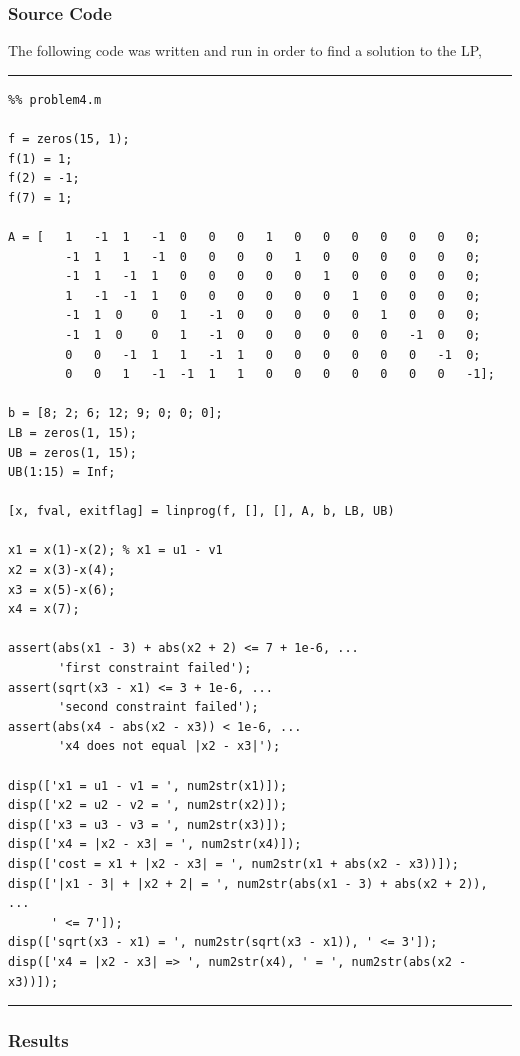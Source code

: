 \documentclass{article}
\begin{document}
\subsubsection{Source Code}

The following code was written and run in order to find a solution to the LP,

\vspace{0.25in}
\hrule
\begin{lstlisting}
%% problem4.m

f = zeros(15, 1);
f(1) = 1;
f(2) = -1;
f(7) = 1;

A = [   1   -1  1   -1  0   0   0   1   0   0   0   0   0   0   0;
        -1  1   1   -1  0   0   0   0   1   0   0   0   0   0   0;
        -1  1   -1  1   0   0   0   0   0   1   0   0   0   0   0;
        1   -1  -1  1   0   0   0   0   0   0   1   0   0   0   0;
        -1  1  0    0   1   -1  0   0   0   0   0   1   0   0   0;
        -1  1  0    0   1   -1  0   0   0   0   0   0   -1  0   0;
        0   0   -1  1   1   -1  1   0   0   0   0   0   0   -1  0;
        0   0   1   -1  -1  1   1   0   0   0   0   0   0   0   -1];
    
b = [8; 2; 6; 12; 9; 0; 0; 0];
LB = zeros(1, 15);
UB = zeros(1, 15);
UB(1:15) = Inf;

[x, fval, exitflag] = linprog(f, [], [], A, b, LB, UB)

x1 = x(1)-x(2); % x1 = u1 - v1
x2 = x(3)-x(4);
x3 = x(5)-x(6);
x4 = x(7);

assert(abs(x1 - 3) + abs(x2 + 2) <= 7 + 1e-6, ...
       'first constraint failed');
assert(sqrt(x3 - x1) <= 3 + 1e-6, ...
       'second constraint failed');
assert(abs(x4 - abs(x2 - x3)) < 1e-6, ...
       'x4 does not equal |x2 - x3|');

disp(['x1 = u1 - v1 = ', num2str(x1)]);
disp(['x2 = u2 - v2 = ', num2str(x2)]);
disp(['x3 = u3 - v3 = ', num2str(x3)]);
disp(['x4 = |x2 - x3| = ', num2str(x4)]);
disp(['cost = x1 + |x2 - x3| = ', num2str(x1 + abs(x2 - x3))]);
disp(['|x1 - 3| + |x2 + 2| = ', num2str(abs(x1 - 3) + abs(x2 + 2)), ...
	  ' <= 7']);
disp(['sqrt(x3 - x1) = ', num2str(sqrt(x3 - x1)), ' <= 3']);
disp(['x4 = |x2 - x3| => ', num2str(x4), ' = ', num2str(abs(x2 - x3))]);
\end{lstlisting}
\hrule
\vspace{0.25in}

\subsubsection{Results}
\end{document}
